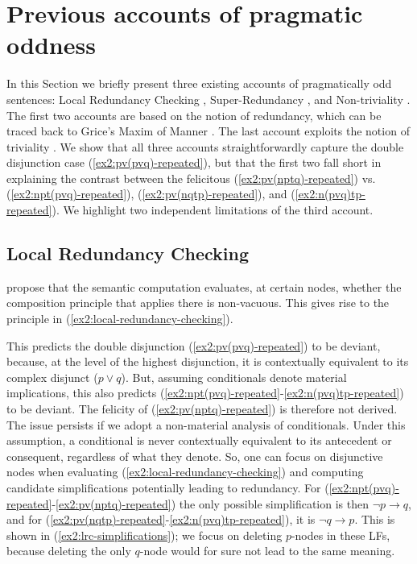 \section{Previous accounts of pragmatic oddness}\label{sec:previous-accounts}
In this Section we briefly present three existing accounts of pragmatically odd sentences: Local Redundancy Checking \citep{Katzir2014}, Super-Redundancy \citep{Kalomoiros2024}, and Non-triviality \cite{Mayr2016}. The first two accounts are based on the notion of redundancy, which can be traced back to Grice's Maxim of Manner \cite{Grice1975}. The last account exploits the notion of triviality \cite{Stalnaker1974}. We show that all three accounts straightforwardly capture the double disjunction case (\ref{ex2:pv(pvq)-repeated}), but that the first two fall short in explaining the contrast between the felicitous (\ref{ex2:pv(nptq)-repeated}) vs. (\ref{ex2:npt(pvq)-repeated}), (\ref{ex2:pv(nqtp)-repeated}), and (\ref{ex2:n(pvq)tp-repeated}). We highlight two independent limitations of the third account.
\subsection{Local Redundancy Checking}
\citet{Katzir2014} propose that the semantic computation evaluates, at
certain nodes, whether the composition principle that applies there is non-vacuous. This gives rise to the principle in (\ref{ex2:local-redundancy-checking}).
\begin{exe}
	\label{ex2:local-redundancy-checking}
\end{exe}
This predicts the double disjunction (\ref{ex2:pv(pvq)-repeated}) to be deviant, because, at the level of the highest disjunction, it is contextually equivalent to its complex disjunct ($p\vee q$). 
But, assuming conditionals denote material implications, this also predicts (\ref{ex2:npt(pvq)-repeated}-\ref{ex2:n(pvq)tp-repeated}) to be deviant. The felicity of (\ref{ex2:pv(nptq)-repeated}) is therefore not derived.\\


The issue persists if we adopt a non-material analysis of conditionals. Under this assumption, a conditional is never contextually equivalent to its antecedent or consequent, regardless of what they denote. So, one can focus on disjunctive nodes when evaluating (\ref{ex2:local-redundancy-checking}) and computing candidate simplifications potentially leading to redundancy. For (\ref{ex2:npt(pvq)-repeated}-\ref{ex2:pv(nptq)-repeated}) the only possible simplification is then $\neg p \rightarrow q$, and for (\ref{ex2:pv(nqtp)-repeated}-\ref{ex2:n(pvq)tp-repeated}), it is $\neg q \rightarrow p$. This is shown in (\ref{ex2:lrc-simplifications}); we focus on deleting $p$-nodes in these LFs, because deleting the only $q$-node would for sure not lead to the same meaning.

